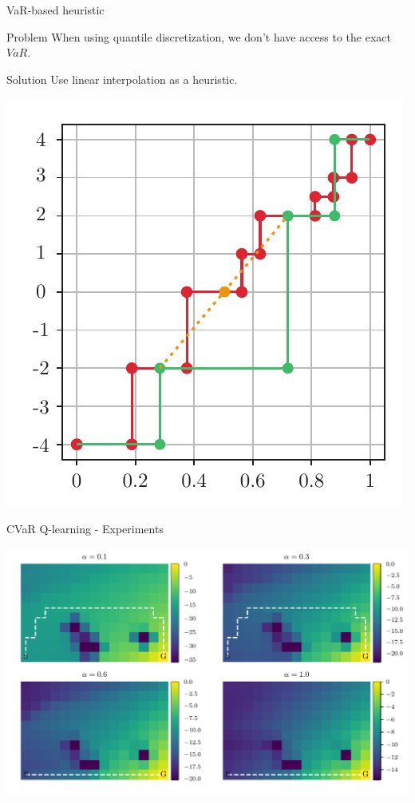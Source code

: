 \documentclass{beamer}
\begin{document}

\begin{frame}{VaR-based heuristic}
\begin{alertblock}
{Problem} When using quantile discretization, we don't have access to the exact $VaR$.
\end{alertblock}
\begin{exampleblock}
{Solution} Use linear interpolation as a heuristic.
\end{exampleblock}
\center
\includegraphics[width=0.38\linewidth]{../gfx/heuristic.pdf}
\end{frame}


\begin{frame}{CVaR Q-learning - Experiments}

\center
\includegraphics[width=\linewidth]{../gfx/q_optimal_paths.pdf}

\end{frame}

%
%
\end{document}
